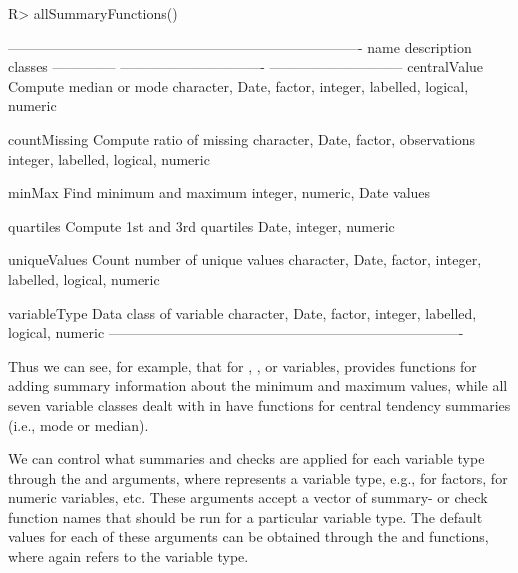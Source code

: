 \documentclass[article,shortnames]{jss}
\begin{document}
\begin{Schunk}
\begin{Sinput}
R> allSummaryFunctions()
\end{Sinput}
\begin{Soutput}
----------------------------------------------------------------------------
name           description                     classes                      
-------------- ------------------------------- -----------------------------
centralValue   Compute median or mode          character, Date, factor,     
                                               integer, labelled, logical,  
                                               numeric                      

countMissing   Compute ratio of missing        character, Date, factor,     
               observations                    integer, labelled, logical,  
                                               numeric                      

minMax         Find minimum and maximum        integer, numeric, Date       
               values                                                       

quartiles      Compute 1st and 3rd quartiles   Date, integer, numeric       

uniqueValues   Count number of unique values   character, Date, factor,     
                                               integer, labelled, logical,  
                                               numeric                      

variableType   Data class of variable          character, Date, factor,     
                                               integer, labelled, logical,  
                                               numeric                      
----------------------------------------------------------------------------
\end{Soutput}
\end{Schunk}

Thus we can see, for example, that for , , or 
variables,  provides functions for adding summary information about
the minimum and maximum values, while all seven variable
classes dealt with in  have functions for central
tendency summaries (i.e., mode or median).

We can control what summaries and checks are applied for each variable type
through the  and  arguments, where 
represents a variable type, e.g.,  for factors,
 for numeric variables, etc. These arguments accept a
vector of summary- or check function names that should be run for a
particular variable type. The default values for each of these
arguments can be obtained through the 
and  functions, where  again refers to
the variable type.
\end{document}
